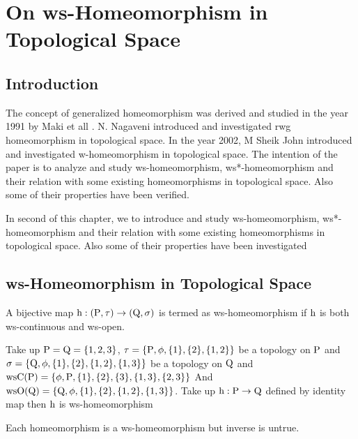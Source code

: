 \chapter{On ws-Homeomorphism in Topological Space}
\graphicspath{{Chapter5/Chapter5Figs/EPS/}{Chapter5/Chapter5Figs/}}

\section{Introduction}\label{sec5.1}

The concept of generalized homeomorphism was derived and studied in the year 1991 by Maki et all \cite{Maki5}. N. Nagaveni \cite{Nagaveni5} introduced and investigated rwg homeomorphism in topological space. In the year 2002, M Sheik John \cite{Sheik1} introduced and investigated w-homeomorphism in topological space. The intention of the paper is to analyze and study ws-homeomorphism, ws*-homeomorphism and their relation with some existing homeomorphisms in topological space. Also some of their properties have been verified.

In second of this chapter, we to introduce and study ws-homeomorphism, ws*-homeomorphism and their relation with some existing homeomorphisms in topological space. Also some of their properties have been investigated

\section{ws-Homeomorphism in Topological Space}\label{sec5.2}

\begin{dfn}\label{defi5.2.1}
A bijective map $\mathrm{h}: (\mathrm{P},\tau)\to (\mathrm{Q},\sigma)$ is termed as ws-homeomor\-phism if $\mathrm{h}$ is both ws-continuous and ws-open.
\end{dfn}

\begin{exm}\label{exam5.2.2} 
Take up $\mathrm{P}=\mathrm{Q}=\{1,2,3\}$, $\tau =\{\mathrm{P}, \phi,\{1\},\{2\},\{1,2\}\}$ be a topology on $\mathrm{P}$ and $\sigma =\{\mathrm{Q},\phi,\{1\},\{2\},\{1,2\},\{1,3\}\}$ be a topology on $\mathrm{Q}$ and $\mathrm{ws}\mathrm{C}(\mathrm{P})= \{\phi, \mathrm{P}, \{1\}, \{2\},\{3\}, \{1, 3\},\{2, 3\}\}$ And $\mathrm{ws}\mathrm{O}(\mathrm{Q}) =\{\mathrm{Q}, \phi,\{1\},\{2\},\{1,2\},\{1,3\}\}$. Take up $\mathrm{h}: \mathrm{P}\to \mathrm{Q}$ defined by identity map then $\mathrm{h}$ is ws-homeomorphism 
\end{exm}

\begin{thm}\label{thm5.2.3}
Each homeomorphism is a ws-homeomorphism but inverse is untrue.
\end{thm}

